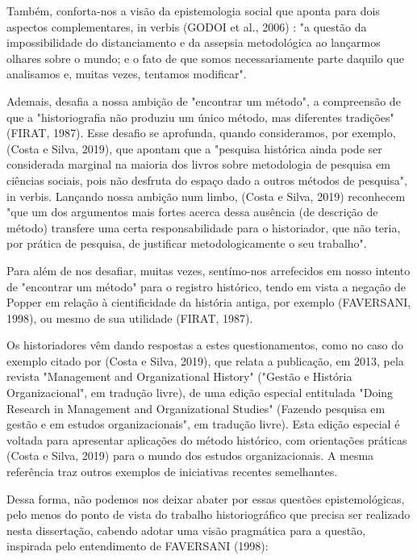 Também, conforta-nos a visão da epistemologia social que aponta para dois aspectos complementares, in verbis (GODOI et al., 2006) : "a questão da impossibilidade do distanciamento e da assepsia metodológica ao lançarmos olhares sobre o mundo; e o fato de que somos necessariamente parte daquilo que analisamos e, muitas vezes, tentamos modificar".

Ademais, desafia a nossa ambição de "encontrar um método", a compreensão de que a "historiografia não produziu um único método, mas diferentes tradições" (FIRAT, 1987).  Esse desafio se aprofunda, quando consideramos, por exemplo, (Costa e Silva, 2019), que apontam que a "pesquisa histórica ainda pode ser considerada marginal na maioria dos livros sobre metodologia de pesquisa em ciências sociais, pois não desfruta do espaço dado a outros métodos de pesquisa", in verbis. Lançando nossa ambição num limbo,  (Costa e Silva, 2019) reconhecem "que um dos argumentos mais fortes acerca dessa ausência (de descrição de método) transfere uma certa responsabilidade para o historiador, que não teria, por prática de pesquisa, de justificar metodologicamente o seu trabalho".

Para além de nos desafiar, muitas vezes, sentímo-nos arrefecidos em nosso intento de "encontrar um método" para o registro histórico, tendo em vista a negação de Popper em relação à cientificidade da história antiga, por exemplo (FAVERSANI, 1998), ou mesmo de sua utilidade (FIRAT, 1987).

Os historiadores vêm dando respostas a estes questionamentos, como no caso do exemplo citado por  (Costa e Silva, 2019), que relata a publicação, em 2013, pela revista "Management and Organizational History" ("Gestão e História Organizacional", em tradução livre), de uma edição especial entitulada "Doing Research in Management and Organizational Studies" (Fazendo pesquisa em gestão e em estudos organizacionais", em tradução livre). Esta edição especial é voltada para apresentar aplicações do método histórico, com orientações práticas (Costa e Silva, 2019) para o mundo dos estudos organizacionais. A mesma referência traz outros exemplos de iniciativas recentes semelhantes.

Dessa forma, não podemos nos deixar abater por essas questões epistemológicas, pelo menos do ponto de vista do trabalho historiográfico que precisa ser realizado nesta dissertação, cabendo adotar uma visão pragmática para a questão, inspirada pelo entendimento de FAVERSANI (1998):


